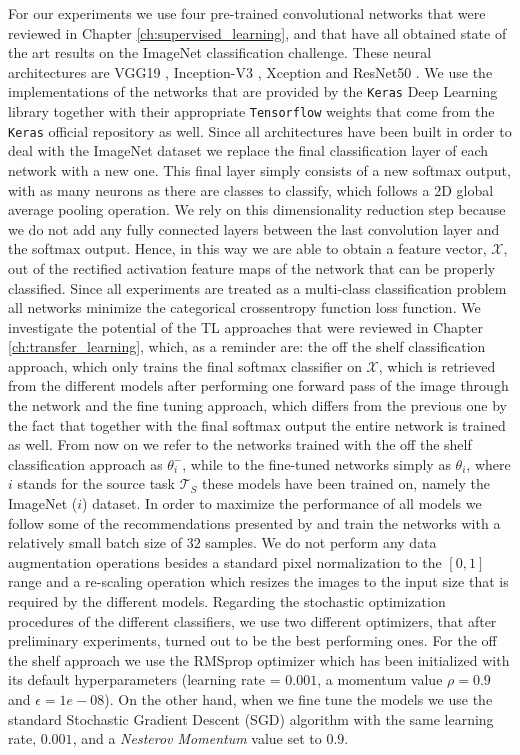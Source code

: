 For our experiments we use four pre-trained convolutional networks that were reviewed in Chapter \ref{ch:supervised_learning}, and that have all obtained state of the art results on the ImageNet classification challenge. These neural architectures are VGG19 \cite{simonyan2014very}, Inception-V3 \cite{szegedy2016rethinking}, Xception \cite{chollet2016xception} and ResNet50 \cite{xie2017aggregated}. We use the implementations of the networks that are provided by the \texttt{Keras} Deep Learning library \cite{chollet2015keras} together with their appropriate \texttt{Tensorflow} weights \cite{abadi2016tensorflow} that come from the \texttt{Keras} official repository as well. Since all architectures have been built in order to deal with the ImageNet dataset we replace the final classification layer of each network with a new one. This final layer simply consists of a new softmax output, with as many neurons as there are classes to classify, which follows a 2D global average pooling operation. We rely on this dimensionality reduction step because we do not add any fully connected layers between the last convolution layer and the softmax output. Hence, in this way we are able to obtain a feature vector, $\mathscr{X}$, out of the rectified activation feature maps of the network that can be properly classified. Since all experiments are treated as a multi-class classification problem all networks minimize the categorical crossentropy function loss function. We investigate the potential of the TL approaches that were reviewed in Chapter \ref{ch:transfer_learning}, which, as a reminder are: the off the shelf classification approach, which only trains the final softmax classifier on $\mathscr{X}$, which is retrieved from the different models after performing one forward pass of the image through the network and the fine tuning approach, which differs from the previous one by the fact that together with the final softmax output the entire network is trained as well. 
From now on we refer to the networks trained with the off the shelf classification approach as $\theta^{-}_{i}$, while to the fine-tuned networks simply as $\theta_{i}$, where $i$ stands for the source task $\mathcal{T}_S$ these models have been trained on, namely the ImageNet ($i$) dataset. In order to maximize the performance of all models we follow some of the recommendations presented by \citet{masters2018revisiting} and train the networks with a relatively small batch size of $32$ samples. We do not perform any data augmentation operations besides a standard pixel normalization to the $[0, 1]$ range and a re-scaling operation which resizes the images to the input size that is required by the different models. Regarding the stochastic optimization procedures of the different classifiers, we use two different optimizers, that after preliminary experiments, turned out to be the best performing ones. For the off the shelf approach we use the RMSprop optimizer \cite{tieleman2012lecture} which has been initialized with its default hyperparameters (learning rate = $0.001$, a momentum value $\rho = 0.9$ and $\epsilon =1e-08$). On the other hand, when we fine tune the models we use the standard Stochastic Gradient Descent (SGD) algorithm with the same learning rate, $0.001$, and a \textit{Nesterov Momentum} value set to $0.9$.
